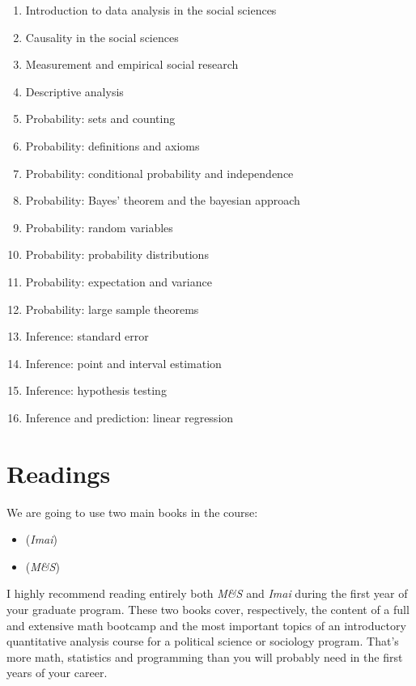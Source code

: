 \documentclass[a4paper,11pt]{article}
\begin{document}
  \begin{enumerate}
        \item Introduction to data analysis in the social sciences
        \item Causality in the social sciences
        \item Measurement and empirical social research
        \item Descriptive analysis
        \item Probability: sets and counting
        \item Probability: definitions and axioms
        \item Probability: conditional probability and independence
        \item Probability: Bayes' theorem and the bayesian approach
        \item Probability: random variables
        \item Probability: probability distributions
        \item Probability: expectation and variance
        \item Probability: large sample theorems
		\item Inference: standard error
        \item Inference: point and interval estimation
        \item Inference: hypothesis testing
        \item Inference and prediction: linear regression
        
    \end{enumerate}

\section{Readings}

We are going to use two main books in the course:

\begin{itemize}
  \item (\emph{Imai}) 
  \item (\emph{M\&S}) 
\end{itemize}

I highly recommend reading entirely both \emph{M\&S} and \emph{Imai} during the first year of your graduate program. These two books cover, respectively, the content of a full and extensive math bootcamp and the most important topics of an introductory quantitative analysis course for a political science or sociology program. That's more math, statistics and programming than you will probably need in the first years of your career.
\end{document}
